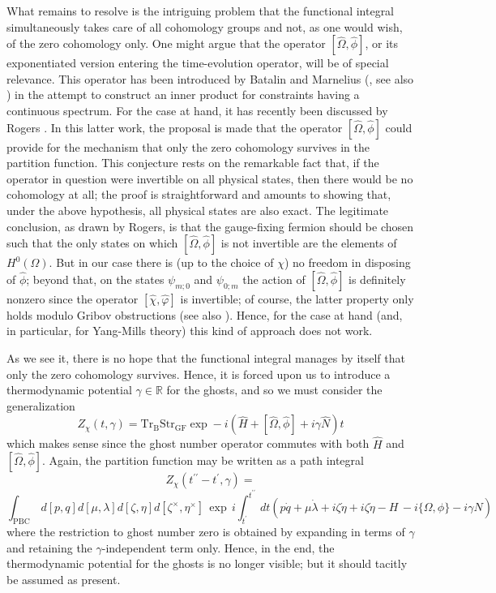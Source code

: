 \documentclass[a4paper,10pt]{article}
\begin{document}
What remains to resolve is the intriguing problem that the functional integral simultaneously takes care 
of all cohomology groups and not, as one would wish, of the zero 
cohomology only. One might argue that the operator $[\hat{\Omega},\hat{\phi}]$, or its 
exponentiated version entering the time-evolution operator, will be of special relevance. 
This operator has been introduced by Batalin and Marnelius (\cite{Bata 95}, see also 
\cite{Marn 91}) in the attempt to construct an inner product for constraints having a 
continuous spectrum. For the case at hand, it has recently been discussed by Rogers 
\cite{Roge 97}. In this latter work, the proposal is made that the operator 
$[\hat{\Omega},\hat{\phi}]$ could provide for the mechanism that only the zero cohomology 
survives in the partition function. This conjecture rests on the remarkable fact that, if 
the operator in question were invertible on all physical states, then there would be no 
cohomology at all; the proof is straightforward and amounts to showing that, under the 
above hypothesis, all physical states are also exact. The legitimate conclusion, as drawn 
by Rogers, is that the gauge-fixing fermion should be chosen such that the only states on 
which $[\hat{\Omega},\hat{\phi}]$ is not invertible are the elements of $H^0(\Omega)$. 
But in our case there is (up to the choice of $\chi$) no freedom in disposing of 
$\hat{\phi}$; beyond that, on the states $\psi_{m;0}$ and $\psi_{0;m}$ the action of 
$[\hat{\Omega},\hat{\phi}]$ is definitely nonzero since the operator 
$[\hat{\chi},\hat{\varphi}]$ is invertible; of course, the latter property only holds 
modulo Gribov obstructions \cite{Grib 78,Sing 78} (see also \cite{Baul 96}). Hence, for 
the case at hand (and, in particular, for Yang-Mills theory) this kind of approach does 
not work.

As we see it, there is no hope that the functional integral manages by itself that only 
the zero cohomology survives. Hence, it is forced upon us to introduce a thermodynamic 
potential $\gamma\in\mathbb{R}$ for the ghosts, and so we must consider the 
generalization
\begin{equation}
Z_{\chi}(t,\gamma)=\mathrm{Tr}_{\mathrm{B}}\mathrm{Str}_{\mathrm{GF}}\exp -
i(\hat{H}+[\hat{\Omega},\hat{\phi}]+i\gamma\hat{N})t
\end{equation}
which makes sense since the ghost number operator commutes with both $\hat{H}$ and 
$[\hat{\Omega},\hat{\phi}]$. Again, the partition function may be written as a path 
integral
\begin{equation}
Z_{\chi}(t^{\prime\prime}-t^{\prime},\gamma)=
\end{equation}
$$\int_{\mathrm{PBC}}\,d[p,q]d[\mu,\lambda]d[\zeta,\eta]
d[\zeta^{\times},\eta^{\times}]\,
\exp\,i\int_{t^{\prime}}^{t^{\prime\prime}}\,dt\left(p\dot{q}+\mu
\dot{\lambda}+i\zeta\dot{\eta}+i\zeta
\dot{\eta}-H\,-i\{\Omega,\phi\}-i\gamma N\right)$$
where the restriction to ghost number zero is obtained by expanding in terms of $\gamma$ 
and retaining the $\gamma$-independent term only. Hence, in the end, the thermodynamic  
potential for the ghosts is no longer visible; but it should tacitly be assumed as 
present.
\end{document}
